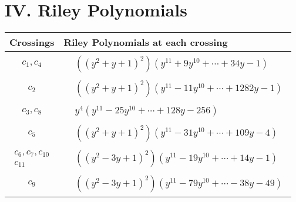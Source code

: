 \documentclass[1p]{elsarticle_modified}
\theoremstyle{definition}
\begin{document}
\centering \section*{ IV. Riley Polynomials}
\begin{tabular}{m{50pt}|m{274pt}}
Crossings & \hspace{64pt}Riley Polynomials at each crossing \\
\hline $$\begin{aligned}c_{1},c_{4}\end{aligned}$$&$\begin{aligned}
&((y^2+y+1)^2)(y^{11}+9 y^{10}+\cdots+34 y-1)
\end{aligned}$\\
\hline $$\begin{aligned}c_{2}\end{aligned}$$&$\begin{aligned}
&((y^2+y+1)^2)(y^{11}-11 y^{10}+\cdots+1282 y-1)
\end{aligned}$\\
\hline $$\begin{aligned}c_{3},c_{8}\end{aligned}$$&$\begin{aligned}
&y^4(y^{11}-25 y^{10}+\cdots+128 y-256)
\end{aligned}$\\
\hline $$\begin{aligned}c_{5}\end{aligned}$$&$\begin{aligned}
&((y^2+y+1)^2)(y^{11}-31 y^{10}+\cdots+109 y-4)
\end{aligned}$\\
\hline $$\begin{aligned}c_{6},c_{7},c_{10}\\c_{11}\end{aligned}$$&$\begin{aligned}
&((y^2-3 y+1)^2)(y^{11}-19 y^{10}+\cdots+14 y-1)
\end{aligned}$\\
\hline $$\begin{aligned}c_{9}\end{aligned}$$&$\begin{aligned}
&((y^2-3 y+1)^2)(y^{11}-79 y^{10}+\cdots-38 y-49)
\end{aligned}$\\
\hline
\end{tabular}
\vskip 2pc
\end{document}
